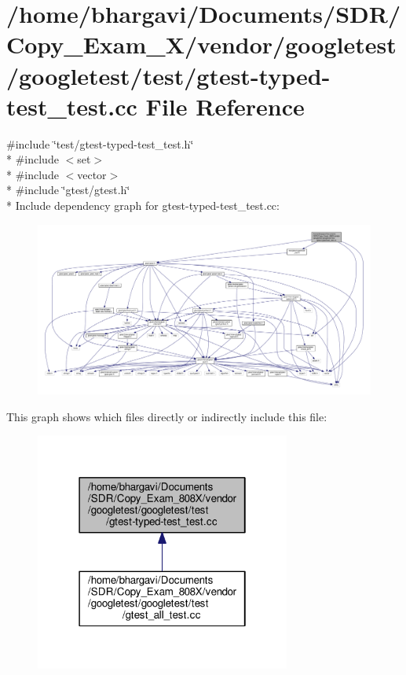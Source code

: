 \hypertarget{gtest-typed-test__test_8cc}{}\section{/home/bhargavi/\+Documents/\+S\+D\+R/\+Copy\+\_\+\+Exam\+\_\+X/vendor/googletest/googletest/test/gtest-\/typed-\/test\+\_\+test.cc File Reference}
\label{gtest-typed-test__test_8cc}
{\ttfamily \#include \char`\"{}test/gtest-\/typed-\/test\+\_\+test.\+h\char`\"{}}\\*
{\ttfamily \#include $<$set$>$}\\*
{\ttfamily \#include $<$vector$>$}\\*
{\ttfamily \#include \char`\"{}gtest/gtest.\+h\char`\"{}}\\*
Include dependency graph for gtest-\/typed-\/test\+\_\+test.cc\+:
\nopagebreak
\begin{figure}[H]
\begin{center}
\leavevmode
\includegraphics[width=350pt]{gtest-typed-test__test_8cc__incl}
\end{center}
\end{figure}
This graph shows which files directly or indirectly include this file\+:
\nopagebreak
\begin{figure}[H]
\begin{center}
\leavevmode
\includegraphics[width=238pt]{gtest-typed-test__test_8cc__dep__incl}
\end{center}
\end{figure}
